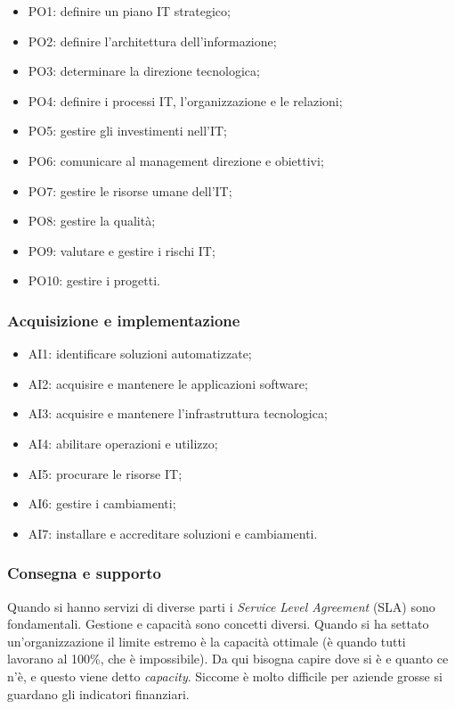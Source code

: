 \begin{itemize}
\item PO1: definire un piano IT strategico;
\item PO2: definire l'architettura dell'informazione;
\item PO3: determinare la direzione tecnologica;
\item PO4: definire i processi IT, l'organizzazione e le relazioni;
\item PO5: gestire gli investimenti nell'IT;
\item PO6: comunicare al management direzione e obiettivi;
\item PO7: gestire le risorse umane dell'IT;
\item PO8: gestire la qualità;
\item PO9: valutare e gestire i rischi IT;
\item PO10: gestire i progetti.

\end{itemize}

\subsubsection{Acquisizione e implementazione}

\begin{itemize}
\item AI1: identificare soluzioni automatizzate;
\item AI2: acquisire e mantenere le applicazioni software;
\item AI3: acquisire e mantenere l'infrastruttura tecnologica;
\item AI4: abilitare operazioni e utilizzo;
\item AI5: procurare le risorse IT;
\item AI6: gestire i cambiamenti;
\item AI7: installare e accreditare soluzioni e cambiamenti.
\end{itemize}

\subsubsection{Consegna e supporto}

Quando si hanno servizi di diverse parti i \textit{Service Level 
Agreement} (SLA) sono fondamentali. Gestione e capacità sono concetti diversi.
Quando si ha settato un'organizzazione il limite estremo è la capacità 
ottimale (è quando tutti lavorano al 100\%, che è impossibile). Da qui bisogna 
capire dove si è e quanto ce n'è, e questo viene detto \textit{capacity}. 
Siccome è molto difficile per aziende grosse si guardano gli indicatori 
finanziari.
